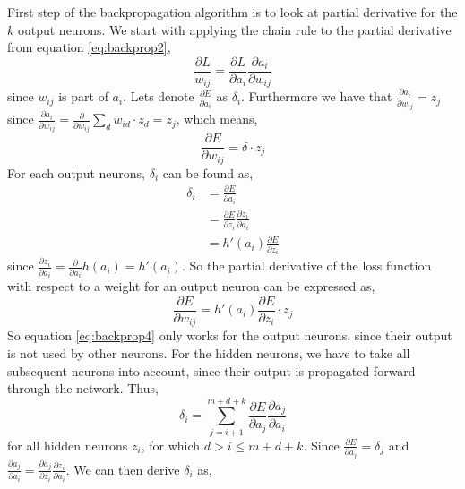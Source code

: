 \documentclass[11pt]{article}
\begin{document}
First step of the backpropagation algorithm is to look at partial derivative for the $k$ output neurons. We start with applying the chain rule to the partial derivative from equation \ref{eq:backprop2},
\begin{equation}\label{eq:backprop3}
    \frac{\partial L}{w_{ij}} = \frac{\partial L}{\partial a_{i}} \frac{\partial a_{i}}{\partial w_{ij}}
\end{equation}
since $w_{ij}$ is part of $a_{i}$. Lets denote $\frac{\partial E}{\partial a_{i}}$ as $\delta_{i}$. Furthermore we have that $\frac{\partial a_{i}}{\partial w_{ij}} = z_{j}$ since $\frac{\partial a_{i}}{\partial w_{ij}} = \frac{\partial}{\partial w_{ij}} \sum_{d} w_{id} \cdot z_{d} = z_{j}$, which means,
\begin{equation}
    \frac{\partial E}{\partial w_{ij}} = \delta \cdot z_{j}
\end{equation}
For each output neurons, $\delta_{i}$ can be found as,
\begin{equation}
\begin{split}
    \delta_{i} &= \frac{\partial E}{\partial a_{i}} \\
    &= \frac{\partial E}{\partial z_{i}} \frac{\partial z_{i}}{\partial a_{i}} \\
    &= h'(a_{i}) \frac{\partial E}{\partial z_{i}}
\end{split}
\end{equation}
since $\frac{\partial z_{i}}{\partial a_{i}} = \frac{\partial}{\partial a_{i}} h(a_{i}) = h'(a_{i})$. So the partial derivative of the loss function with respect to a weight for an output neuron can be expressed as,
\begin{equation} \label{eq:backprop4}
    \frac{\partial E}{\partial w_{ij}} = h'(a_{i}) \frac{\partial E}{\partial z_{i}} \cdot z_{j}
\end{equation}
So equation \ref{eq:backprop4} only works for the output neurons, since their output is not used by other neurons. For the hidden neurons, we have to take all subsequent neurons into account, since their output is propagated forward through the network. Thus,
\begin{equation}
    \delta_{i} = \sum_{j = i + 1}^{m + d + k} \frac{\partial E}{\partial a_{j}} \frac{\partial a_{j}}{\partial a_{i}}
\end{equation}
for all hidden neurons $z_{i}$, for which $d > i \leq m + d + k$. Since $\frac{\partial E}{\partial a_{j}} = \delta_{j}$ and $\frac{\partial a_{j}}{\partial a_{i}} = \frac{\partial a_{j}}{\partial z_{i}} \frac{\partial z_{i}}{\partial a_{i}}$. We can then derive $\delta_{i}$ as,
\end{document}
